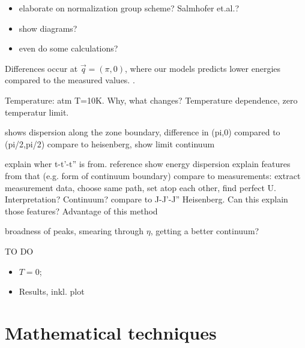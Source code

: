 \documentclass[a4paper,10pt]{report}
\begin{document}
\begin{itemize}
\item elaborate on normalization group scheme? Salmhofer et.al.\cite{RevModPhys.84.299}?
\item show diagrams?
\item even do some calculations?
\end{itemize}







Differences occur at $\vec q = (\pi,0)$, where our models predicts lower energies compared to the measured values.
.





Temperature: atm T=10K. Why, what changes? Temperature dependence, zero temperatur limit.



shows dispersion along the zone boundary,
difference in (pi,0) compared to (pi/2,pi/2)
compare to heisenberg, show limit
continuum




 explain wher t-t'-t'' is from. reference
show energy dispersion
explain features from that (e.g. form of continuum boundary)
compare to measurements: extract measurement data, choose same path, set atop each other, find perfect U. Interpretation? Continuum?
compare to J-J'-J'' Heisenberg. Can this explain those features? Advantage of this method

broadness of peaks, smearing through $\eta$, getting a better continuum?
\newpage

TO DO
\begin{itemize}
 \item $T=0$;
 \item Results, inkl. plot
\end{itemize}










\appendix

\chapter{Mathematical techniques}
\end{document}
